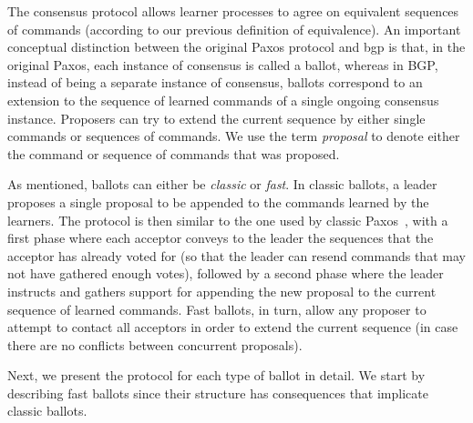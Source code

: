 The consensus protocol allows learner processes to agree on equivalent sequences of commands (according to our previous definition of equivalence). An important conceptual distinction between the original Paxos protocol and \acrshort{bgp} is that, in the original Paxos, each instance of consensus is called a ballot, whereas in BGP, instead of being a separate instance of consensus, ballots correspond to an extension to the sequence of learned commands of a single ongoing consensus instance. Proposers can try to extend the current sequence by either single commands or sequences of commands. We use the term \textit{proposal} to denote either the command or sequence of commands that was proposed.\par
As mentioned, ballots can either be \textit{classic} or \textit{fast}. In classic ballots, a leader proposes a single proposal to be appended to the commands learned by the learners. The protocol is then similar to the one used by classic Paxos~\cite{Lam98}, with a first phase where each acceptor conveys to the leader the sequences that the acceptor has already voted for (so that the leader can resend commands that may not have gathered enough votes), followed by a second phase where the leader instructs and gathers support for appending the new proposal to the current sequence of learned commands. Fast ballots, in turn, allow any proposer to attempt to contact all acceptors in order to extend the current sequence (in case there are no conflicts between concurrent proposals).\par
Next, we present the protocol for each type of ballot in detail. We start by describing fast ballots since their structure has consequences that implicate classic ballots.

